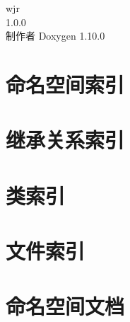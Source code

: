 \documentclass[twoside]{book}
\newcommand{\+}{\discretionary{\mbox{\scriptsize$\hookleftarrow$}}{}{}}
\newcommand{\clearemptydoublepage}{%
    \newpage{\pagestyle{empty}\cleardoublepage}%
  }
\begin{document}
  \raggedbottom
  \begin{CJK}{UTF8}{gbsn}
    \hypersetup{pageanchor=false,
                bookmarksnumbered=true,
                pdfencoding=unicode
               }
  \begin{titlepage}
  \vspace*{7cm}
  \begin{center}%
  {\Large wjr}\\
  [1ex]\large 1.\+0.\+0 \\
  \vspace*{1cm}
  {\large 制作者 Doxygen 1.10.0}\\
  \end{center}
  \end{titlepage}
  \clearemptydoublepage
  \tableofcontents
  \clearemptydoublepage
  \hypersetup{pageanchor=true}

\chapter{命名空间索引}

\chapter{继承关系索引}

\chapter{类索引}

\chapter{文件索引}

\chapter{命名空间文档}
























\end{CJK}
\end{document}
